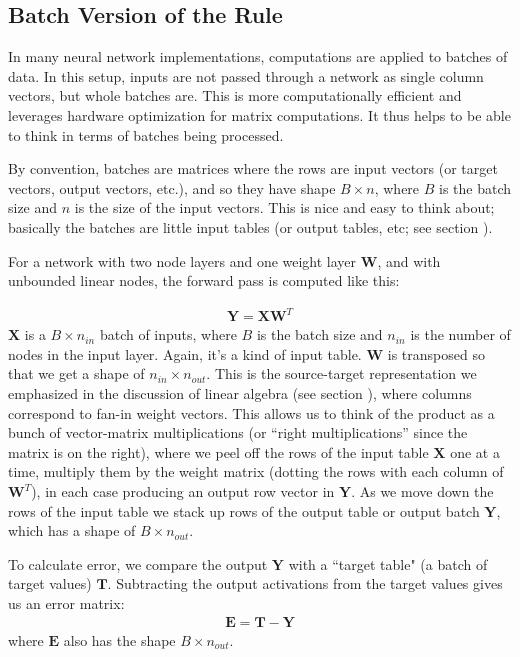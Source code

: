 \subsection{Batch Version of the Rule}

In many neural network implementations, computations are applied to batches of data. In this setup, inputs are not passed through a network as single column vectors, but whole batches are. This is more computationally efficient and leverages hardware optimization for matrix computations.  It thus helps to be able to think in terms of batches being processed.

By convention, batches are matrices where the rows are input vectors (or target vectors, output vectors, etc.), and so they have shape $B \times n$, where $B$ is the batch size and $n$ is the size of the input vectors. This is nice and easy to think about; basically the batches are little input tables (or output tables, etc; see section ).


For a network with two node layers and one weight layer $\mathbf{W}$, and with unbounded linear nodes, the forward pass is computed like this:

\begin{eqnarray}
\mathbf{Y} = \mathbf{X} \mathbf{W}^T
\end{eqnarray}
$\mathbf{X}$ is a  $B \times n_{in}$ batch of inputs, where $B$ is the batch size and $n_{in}$ is the number of nodes in the input layer. Again, it's a kind of input table. $\mathbf{W}$ is transposed so that we get a shape of $n_{in} \times n_{out}$. This is the source-target representation we emphasized in the discussion of linear algebra (see section ), where columns correspond to fan-in weight vectors. This allows us to think of the product as a bunch of vector-matrix multiplications (or ``right multiplications'' since the matrix is on the right), where we peel off the rows of the input table $\mathbf{X}$ one at a time, multiply them by the weight matrix (dotting the rows with each column of $\mathbf{W}^T$), in each case producing an output row vector in $\mathbf{Y}$. As we move down the rows of the input table we stack up rows of the output table or output batch $\mathbf{Y}$, which has a shape of $B \times n_{out}$.

To calculate error, we compare the output $\mathbf{Y}$ with a ``target table" (a batch of target values) $\mathbf{T}$. Subtracting the output activations from the target values  gives us an error matrix:
\begin{eqnarray}
\mathbf{E} = \mathbf{T} - \mathbf{Y}
\end{eqnarray}
where $\mathbf{E}$ also has the shape $B \times n_{out}$.

